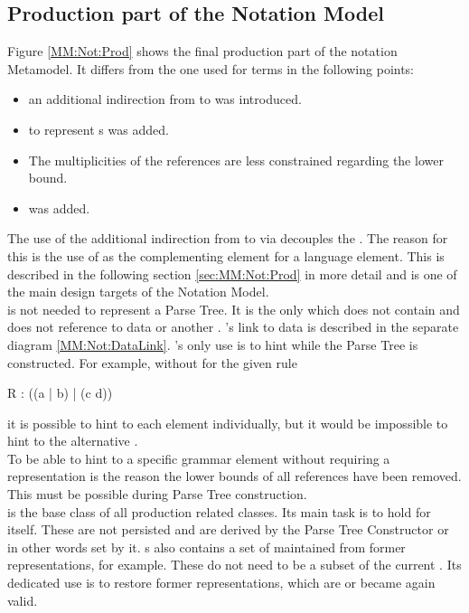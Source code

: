 \subsection{Production part of the Notation Model}
Figure \ref{MM:Not:Prod} shows the final production part of the notation Metamodel. It differs from the one used for terms in the following points:
\begin{itemize}
	\item an additional indirection from  to  was introduced. 
	\item {} to represent s was added.
	\item The multiplicities of the references are less constrained regarding the lower bound.
	\item {} was added.
\end{itemize}
The use of the additional indirection from  to  via  decouples the . The reason for this is the use of  as the complementing element for a language element. This is described in the following section \ref{sec:MM:Not:Prod} in more detail and is one of the main design targets of the Notation Model.\\
 is not needed to represent a Parse Tree. It is the only  which does not contain and does not reference to data or another . 's link to data is described in the separate diagram \ref{MM:Not:DataLink}. 's only use is to hint while the Parse Tree is constructed. For example, without  for the given rule
\begin{xtxt}
R : ((a | b) | (c d)) 
\end{xtxt}
it is possible to hint to each element individually, but it would be impossible to hint to the alternative . \\
To be able to hint to a specific grammar element without requiring a representation is the reason the lower bounds of all references have been removed. This must be possible during Parse Tree construction.\\
 is the base class of all production related classes. Its main task is to hold  for itself. These  are not persisted and are derived by the Parse Tree Constructor or in other words set by it. s also contains a set of  maintained from former representations, for example. These do not need to be a subset of the current . Its dedicated use is to restore former representations, which are or became again valid.

